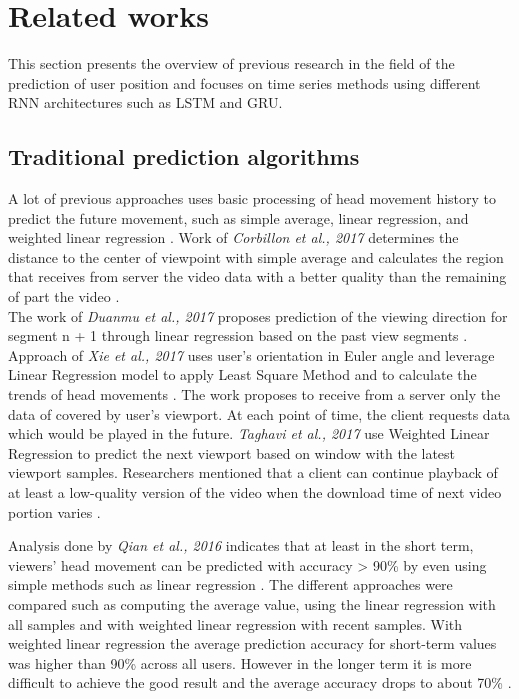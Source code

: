 \newpage
\section{Related works}
\label{sec:related}
This section presents the overview of previous research in the field of the prediction of user position and focuses on time series methods using different RNN architectures such as LSTM and GRU.


\subsection{Traditional prediction algorithms}
\label{sec:related:timeseries}
A lot of previous approaches uses basic processing of head movement history to predict the future movement, such as simple average, linear regression, and weighted linear regression \cite{attention_saliency}. Work of \textit{Corbillon et al., 2017} determines the distance to the center of viewpoint with simple average and calculates the region that receives from server the video data with a better quality than the remaining of part the video \cite{simple_average}.\\ The work of \textit{Duanmu et al., 2017} proposes prediction of the viewing direction for segment n + 1 through linear regression based on the past view segments \cite{linreg1}. Approach of \textit{Xie et al., 2017} uses user’s orientation in Euler angle and leverage Linear Regression model to apply Least Square Method and to calculate the trends of head movements \cite{linreg2}. The work \cite{linreg3} proposes to receive from a server only the data of covered by user's viewport. At each point of time, the client requests data which would be played in the future. \textit{Taghavi et al., 2017} use Weighted Linear Regression to predict the next viewport based on window with the latest viewport samples. Researchers mentioned that a client can continue playback of at least a low-quality version of the video when the download time of next video portion varies \cite{linreg3}.

Analysis done by \textit{Qian et al., 2016} indicates that at least in the short term, viewers’ head movement can be predicted with accuracy > 90\% by even using simple methods such as linear regression \cite{cellular_opt}. The different approaches were compared such as computing the average value, using the linear regression with all samples and with weighted linear regression with recent samples. With weighted linear regression the average prediction accuracy for short-term values was higher than 90\% across all users. However in the longer term it is more difficult to achieve the good result and the average accuracy drops to about 70\% \cite{cellular_opt}.


